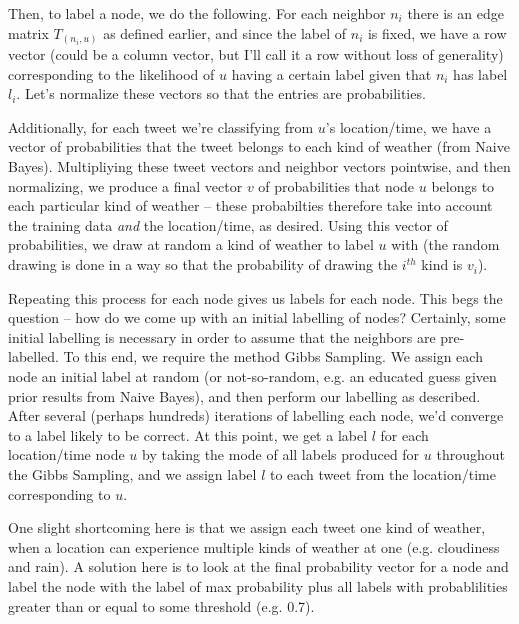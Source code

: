 	Then, to label a node, we do the following. For each neighbor $n_i$ there is an edge matrix $T_{(n_i,u)}$ as defined earlier, and since the label of $n_i$ is fixed, we have a row vector (could be a column vector, but I'll call it a row without loss of generality) corresponding to the likelihood of $u$ having a certain label given that $n_i$ has label $l_i$. Let's normalize these vectors so that the entries are probabilities. 

	Additionally, for each tweet we're classifying from $u$'s location/time, we have a vector of probabilities that the tweet belongs to each kind of weather (from Naive Bayes). Multipliying these tweet vectors and neighbor vectors pointwise, and then normalizing, we produce a final vector $v$ of probabilities that node $u$ belongs to each particular kind of weather -- these probabilties therefore take into account the training data \emph{and} the location/time, as desired. Using this vector of probabilities, we draw at random a kind of weather to label $u$ with (the random drawing is done in a way so that the probability of drawing the $i^{th}$ kind is $v_i$).

	Repeating this process for each node gives us labels for each node. This begs the question -- how do we come up with an initial labelling of nodes? Certainly, some initial labelling is necessary in order to assume that the neighbors are pre-labelled. To this end, we require the method Gibbs Sampling. We assign each node an initial label at random (or not-so-random, e.g. an educated guess given prior results from Naive Bayes), and then perform our labelling as described. After several (perhaps hundreds) iterations of labelling each node, we'd converge to a label likely to be correct. At this point, we get a label $l$ for each location/time node $u$ by taking the mode of all labels produced for $u$ throughout the Gibbs Sampling, and we assign label $l$ to each tweet from the location/time corresponding to $u$. 

	One slight shortcoming here is that we assign each tweet one kind of weather, when a location can experience multiple kinds of weather at one (e.g. cloudiness and rain). A solution here is to look at the final probability vector for a node and label the node with the label of max probability plus all labels with probablilities greater than or equal to some threshold (e.g. 0.7).